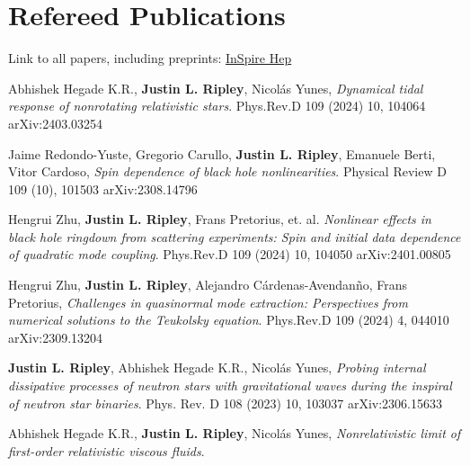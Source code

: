 \documentclass{my_cv}
\begin{document}
\section{Refereed Publications}
Link to all papers, including
preprints: \href{https://inspirehep.net/authors/1477964}{InSpire Hep}
\begin{etaremune}
\item Abhishek Hegade K.R., {\bf Justin L. Ripley}, Nicol\'as Yunes, 
    \emph{Dynamical tidal response of nonrotating relativistic stars}.
    Phys.Rev.D 109 (2024) 10, 104064  
    arXiv:2403.03254
\item Jaime Redondo-Yuste, Gregorio Carullo, {\bf Justin L. Ripley}, Emanuele Berti, Vitor Cardoso, 
    \emph{Spin dependence of black hole nonlinearities}.
    Physical Review D 109 (10), 101503  
    arXiv:2308.14796
\item Hengrui Zhu, {\bf Justin L. Ripley}, Frans Pretorius, et. al. 
    \emph{Nonlinear effects in black hole ringdown from scattering experiments: Spin and initial data dependence of quadratic mode coupling}.
    Phys.Rev.D 109 (2024) 10, 104050 
    arXiv:2401.00805 
\item Hengrui Zhu, {\bf Justin L. Ripley}, Alejandro C\'ardenas-Avendan\~no, Frans Pretorius, 
    \emph{Challenges in quasinormal mode extraction: Perspectives from numerical solutions to the Teukolsky equation}.
    Phys.Rev.D 109 (2024) 4, 044010  
    arXiv:2309.13204
\item {\bf Justin L. Ripley}, Abhishek Hegade K.R., Nicol\'{a}s Yunes, 
    \emph{Probing internal dissipative processes of neutron stars with gravitational waves during the inspiral of neutron star binaries}.
    Phys. Rev. D 108 (2023) 10, 103037  
    arXiv:2306.15633
\item Abhishek Hegade K.R., {\bf Justin L. Ripley}, Nicol\'{a}s Yunes, 
    \emph{Nonrelativistic limit of first-order relativistic viscous fluids}.

\end{etaremune}
\end{document}
